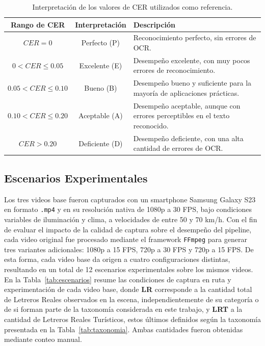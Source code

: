 \documentclass[runningheads]{llncs}
\begin{document}
\begin{table}[H]
\centering
\caption{Interpretación de los valores de CER utilizados como referencia.}
\label{tab:rangos_cer}
\begin{tabular}{|c|c|>{\centering\arraybackslash}p{8cm}|}
\hline
\rowcolor{gray!20}
\textbf{Rango de CER} & \textbf{Interpretación} & \textbf{Descripción} \\
\hline
$CER = 0$ & Perfecto (P) & Reconocimiento perfecto, sin errores de OCR. \\
\hline
$0 < CER \leq 0.05$ & Excelente (E) & Desempeño excelente, con muy pocos errores de reconocimiento. \\
\hline
$0.05 < CER \leq 0.10$ & Bueno (B) & Desempeño bueno y suficiente para la mayoría de aplicaciones prácticas. \\
\hline
$0.10 < CER \leq 0.20$ & Aceptable (A) & Desempeño aceptable, aunque con errores perceptibles en el texto reconocido. \\
\hline
$CER > 0.20$ & Deficiente (D) & Desempeño deficiente, con una alta cantidad de errores de OCR. \\
\hline
\end{tabular}
\end{table}


\subsection{Escenarios Experimentales}
Los tres videos base fueron capturados con un smartphone Samsung Galaxy 
S23 en formato \texttt{.mp4} y en su resolución nativa de 1080p a 30 FPS, 
bajo condiciones variables de iluminación y clima, a velocidades de 
entre 50 y 70 km/h. Con el fin de evaluar el impacto de la calidad de 
captura sobre el desempeño del pipeline, cada video original fue 
procesado mediante el framework \texttt{FFmpeg} \cite{ffmpeg} para generar tres 
variantes adicionales: 1080p a 15 FPS, 720p a 30 FPS y 720p a 15 FPS. 
De esta forma, cada video base da origen a cuatro configuraciones 
distintas, resultando en un total de 12 escenarios experimentales sobre 
los mismos videos. En la Tabla~\ref{tab:escenarios} resume las condiciones
 de captura en ruta y experimentación de cada video base, donde \textbf{LR}
  corresponde a la cantidad total de Letreros Reales observados en la
   escena, independientemente de su categoría o de si forman parte de 
   la taxonomía considerada en este trabajo, y \textbf{LRT} a la cantidad 
   de Letreros Reales Turísticos, estos últimos definidos según la 
   taxonomía presentada en la Tabla~\ref{tab:taxonomia}. Ambas cantidades
    fueron obtenidas mediante conteo manual.
\end{document}
